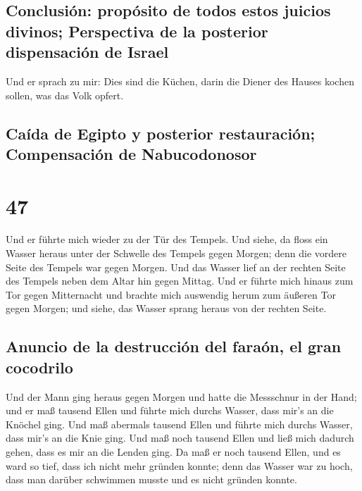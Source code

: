 \hypertarget{conclusiuxf3n-propuxf3sito-de-todos-estos-juicios-divinos-perspectiva-de-la-posterior-dispensaciuxf3n-de-israel}{%
\subsection{Conclusión: propósito de todos estos juicios divinos;
Perspectiva de la posterior dispensación de
Israel}\label{conclusiuxf3n-propuxf3sito-de-todos-estos-juicios-divinos-perspectiva-de-la-posterior-dispensaciuxf3n-de-israel}}

 Und er sprach zu mir: Dies sind die Küchen, darin die
Diener des Hauses kochen sollen, was das Volk opfert.

\hypertarget{cauxedda-de-egipto-y-posterior-restauraciuxf3n-compensaciuxf3n-de-nabucodonosor}{%
\subsection{Caída de Egipto y posterior restauración; Compensación de
Nabucodonosor}\label{cauxedda-de-egipto-y-posterior-restauraciuxf3n-compensaciuxf3n-de-nabucodonosor}}

\hypertarget{section-46}{%
\section{47}\label{section-46}}

 Und er führte mich wieder zu der Tür des Tempels. Und
siehe, da floss ein Wasser heraus unter der Schwelle des Tempels gegen
Morgen; denn die vordere Seite des Tempels war gegen Morgen. Und das
Wasser lief an der rechten Seite des Tempels neben dem Altar hin gegen
Mittag.  Und er führte mich hinaus zum Tor gegen
Mitternacht und brachte mich auswendig herum zum äußeren Tor gegen
Morgen; und siehe, das Wasser sprang heraus von der rechten Seite.

\hypertarget{anuncio-de-la-destrucciuxf3n-del-farauxf3n-el-gran-cocodrilo}{%
\subsection{Anuncio de la destrucción del faraón, el gran
cocodrilo}\label{anuncio-de-la-destrucciuxf3n-del-farauxf3n-el-gran-cocodrilo}}

 Und der Mann ging heraus gegen Morgen und hatte die
Messschnur in der Hand; und er maß tausend Ellen und führte mich durchs
Wasser, dass mir's an die Knöchel ging.  Und maß abermals
tausend Ellen und führte mich durchs Wasser, dass mir's an die Knie
ging. Und maß noch tausend Ellen und ließ mich dadurch gehen, dass es
mir an die Lenden ging.  Da maß er noch tausend Ellen, und
es ward so tief, dass ich nicht mehr gründen konnte; denn das Wasser war
zu hoch, dass man darüber schwimmen musste und es nicht gründen konnte.

